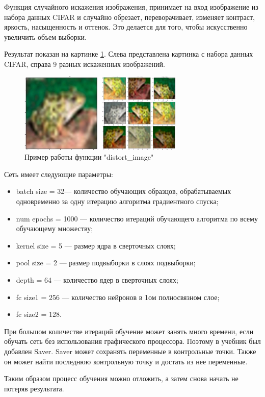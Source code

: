 Функция случайного искажения изображения, принимает на вход изображение из набора данных CIFAR и случайно обрезает, переворачивает, изменяет контраст, яркость, насыщенность и оттенок. Это делается для того, чтобы искусственно увеличить объем выборки.

Результат показан на картинке  \ref{fig:DISORT}. Слева представлена картинка с набора данных CIFAR, справа 9 разных искаженных изображений.

\begin{figure}[htbp]
	\centering
	\includegraphics[width=0.7\textwidth]{fig/disort.jpg}
	\caption{Пример работы функции "distort_image"}%
	\label{fig:DISORT}
\end{figure} 


Сеть имеет следующие параметры:
\begin{itemize}
\item batch size = 32— количество обучающих образцов, обрабатываемых одновременно за одну итерацию алгоритма градиентного спуска;
\item num epochs = 1000 — количество итераций обучающего алгоритма по всему обучающему множеству;
\item kernel size = 5 — размер ядра в сверточных слоях;
\item pool size = 2 — размер подвыборки в слоях подвыборки;
\item depth = 64 — количество ядер в сверточных слоях;
\item fc size1 = 256 — количество нейронов в 1ом полносвязном слое;
\item fc size2 = 128.
\end{itemize}

При большом количестве итераций обучение может занять много времени, если обучать сеть без использования графического процессора. Поэтому в учебник был добавлен Saver. Saver может сохранять переменные в контрольные точки.  Также он может найти последнюю контрольную точку и достать из нее переменные.

Таким образом процесс обучения можно отложить, а затем снова начать не потеряв результата.



